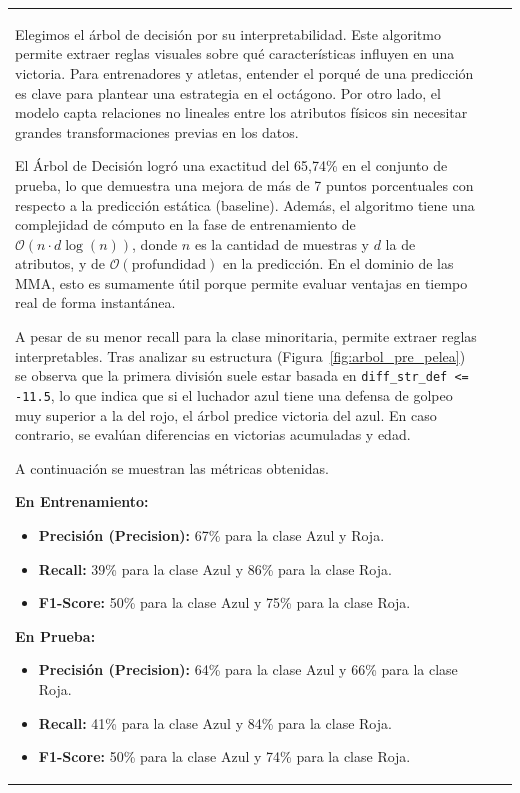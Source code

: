 \documentclass[11pt,a4paper]{article}
\begin{document}
\begin{longtable}{>{\raggedright\arraybackslash}p{5.6cm}>{\raggedright\arraybackslash}p{1.3cm}>{\raggedright\arraybackslash}p{5.1cm}}
Elegimos el árbol de decisión por su interpretabilidad. Este algoritmo permite extraer reglas visuales sobre qué características influyen en una victoria. Para entrenadores y atletas, entender el porqué de una predicción es clave para plantear una estrategia en el octágono. Por otro lado, el modelo capta relaciones no lineales entre los atributos físicos sin necesitar grandes transformaciones previas en los datos.

El Árbol de Decisión logró una exactitud del 65,74\% en el conjunto de prueba, lo que demuestra una mejora de más de 7 puntos porcentuales con respecto a la predicción estática (baseline). Además, el algoritmo tiene una complejidad de cómputo en la fase de entrenamiento de $\mathcal{O}(n \cdot d \log(n))$, donde $n$ es la cantidad de muestras y $d$ la de atributos, y de $\mathcal{O}(\text{profundidad})$ en la predicción. En el dominio de las MMA, esto es sumamente útil porque permite evaluar ventajas en tiempo real de forma instantánea. 

A pesar de su menor recall para la clase minoritaria, permite extraer reglas interpretables. Tras analizar su estructura (Figura~\ref{fig:arbol_pre_pelea}) se observa que la primera división suele estar basada en \texttt{diff\_str\_def <= -11.5}, lo que indica que si el luchador azul tiene una defensa de golpeo muy superior a la del rojo, el árbol predice victoria del azul. En caso contrario, se evalúan diferencias en victorias acumuladas y edad.

A continuación se muestran las métricas obtenidas.

\noindent
\textbf{En Entrenamiento:}

\begin{itemize}
    \item \textbf{Precisión (Precision):} 67\% para la clase Azul y Roja.
    \item \textbf{Recall:} 39\% para la clase Azul y 86\% para la clase Roja.
    \item \textbf{F1-Score:} 50\% para la clase Azul y 75\% para la clase Roja.
\end{itemize}

\noindent
\textbf{En Prueba:}

\begin{itemize}
    \item \textbf{Precisión (Precision):} 64\% para la clase Azul y 66\% para la clase Roja.
    \item \textbf{Recall:} 41\% para la clase Azul y 84\% para la clase Roja.
    \item \textbf{F1-Score:} 50\% para la clase Azul y 74\% para la clase Roja.
\end{itemize}


\end{longtable}
\end{document}
